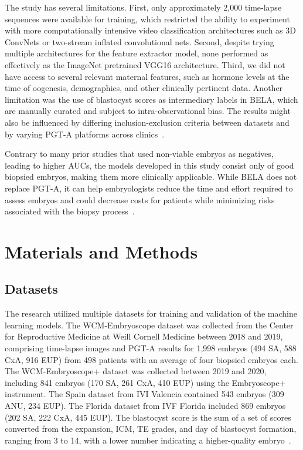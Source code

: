 \documentclass[12pt]{article}
\begin{document}
The study has several limitations. First, only approximately 2,000 time-lapse sequences were available for training, which restricted the ability to experiment with more computationally intensive video classification architectures such as 3D ConvNets or two-stream inflated convolutional nets. Second, despite trying multiple architectures for the feature extractor model, none performed as effectively as the ImageNet pretrained VGG16 architecture. Third, we did not have access to several relevant maternal features, such as hormone levels at the time of oogenesis, demographics, and other clinically pertinent data. Another limitation was the use of blastocyst scores as intermediary labels in BELA, which are manually curated and subject to intra-observational bias. The results might also be influenced by differing inclusion-exclusion criteria between datasets and by varying PGT-A platforms across clinics~\citep{griffin2024pgta, capalbo2021preimplantation}.

Contrary to many prior studies that used non-viable embryos as negatives, leading to higher AUCs, the models developed in this study consist only of good biopsied embryos, making them more clinically applicable. While BELA does not replace PGT-A, it can help embryologists reduce the time and effort required to assess embryos and could decrease costs for patients while minimizing risks associated with the biopsy process~\citep{hodes2019ivfcost}.

\section{Materials and Methods}

\subsection{Datasets}

The research utilized multiple datasets for training and validation of the machine learning models. The WCM-Embryoscope dataset was collected from the Center for Reproductive Medicine at Weill Cornell Medicine between 2018 and 2019, comprising time-lapse images and PGT-A results for 1,998 embryos (494 SA, 588 CxA, 916 EUP) from 498 patients with an average of four biopsied embryos each. The WCM-Embryoscope+ dataset was collected between 2019 and 2020, including 841 embryos (170 SA, 261 CxA, 410 EUP) using the Embryoscope+ instrument. The Spain dataset from IVI Valencia contained 543 embryos (309 ANU, 234 EUP). The Florida dataset from IVF Florida included 869 embryos (202 SA, 222 CxA, 445 EUP). The blastocyst score is the sum of a set of scores converted from the expansion, ICM, TE grades, and day of blastocyst formation, ranging from 3 to 14, with a lower number indicating a higher-quality embryo~\citep{racowsky2019national}.
\end{document}
